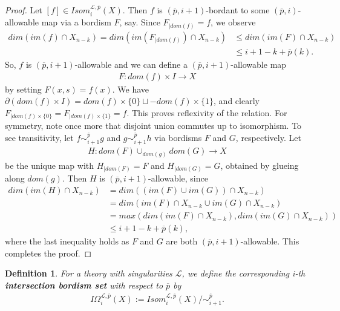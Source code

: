 \documentclass{scrreprt}
\newtheorem{definition}[prop]{Definition}
\begin{document}
\begin{proof}
Let $[f] \in Isom_i^{\mathcal{L}, \overline{p}}(X)$. Then $f$ is $(\overline{p},i+1)$-bordant to some $(\overline{p},i)$-allowable map via a bordism $F$, say. Since $F_{|dom(f)}=f$, we observe
\begin{align*}
dim(im(f) \cap X_{n-k}) = dim(im(F_{|dom(f)}) \cap X_{n-k}) &\leq dim(im(F) \cap X_{n-k}) \\ &\leq i+1-k+ \overline{p}(k).
\end{align*}
So, $f$ is $(\overline{p},i+1)$-allowable and we can define a $(\overline{p},i+1)$-allowable map \begin{align*}
F: dom(f) \times I \to X
\end{align*} by setting $F(x,s)=f(x)$. We have $\partial(dom(f) \times I)= dom(f) \times \{ 0 \} \sqcup -dom(f) \times \{  1 \}$, and clearly $F_{|dom(f) \times \{  0 \} }=F_{|dom(f) \times \{  1 \} } = f$. This proves reflexivity of the relation. For symmetry, note once more that disjoint union commutes up to isomorphism. To see transitivity, let $f \sim_{i+1}^{\overline{p}} g$ and $g \sim_{i+1}^{\overline{p}} h$ via bordisms $F$ and $G$, respectively. Let
\begin{align*}
H: dom(F) \cup_{dom(g)} dom(G) \to X
\end{align*}
be the unique map with $H_{|dom(F)}=F$ and $H_{|dom(G)}=G$, obtained by glueing along $dom(g)$. Then $H$ is $(\overline{p},i+1)$-allowable, since
\begin{align*}
dim(im(H) \cap X_{n-k}) &= dim((im(F) \cup im(G)) \cap X_{n-k})\\ & = dim(im(F) \cap X_{n-k} \cup im(G) \cap X_{n-k}) \\ &= max(dim(im(F) \cap X_{n-k}), dim(im(G) \cap X_{n-k})) \\ &\leq i+1-k+ \overline{p}(k),
\end{align*}
where the last inequality holds as $F$ and $G$ are both $(\overline{p},i+1)$-allowable. This completes the proof.
\end{proof}

\begin{definition}
For a theory with singularities $\mathcal{L}$, we define the corresponding i-th \textbf{intersection bordism set} with respect to $\overline{p}$ by 
\begin{align*}
I \Omega_i^{\mathcal{L}, \overline{p}}(X) := Isom_i^{\mathcal{L}, \overline{p}}(X)/ \sim_{i+1}^{\overline{p}} .
\end{align*}
\end{definition}
\end{document}
